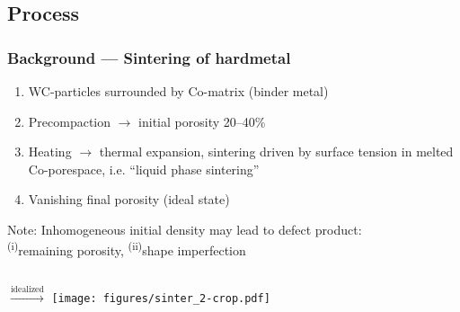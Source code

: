 \documentclass[11pt]{beamer} %
\begin{document}
\subsection{Process}
\begin{frame}
 \frametitle{Background --- Sintering of hardmetal}


 \begin{enumerate}
  \item WC-particles surrounded by Co-matrix (binder metal)
  \item Precompaction $\rightarrow$ initial porosity 20--40\%
  \item Heating $\rightarrow$ thermal expansion, sintering driven by surface tension in melted Co-porespace, i.e. ``liquid phase sintering''
  \item Vanishing final porosity (ideal state)
  

 \end{enumerate}
\alert{Note: Inhomogeneous initial density may lead to defect product:\\ \textsuperscript{(i)}remaining porosity, \textsuperscript{(ii)}shape imperfection }
\begin{center}
 \begin{columns}
 \centering
 \centering
 $\xrightarrow{\text{idealized}}$
 \centering
 \texttt{[image: figures/sinter\_2-crop.pdf]}
 \end{columns}
\end{center}
\end{frame}
\end{document}
